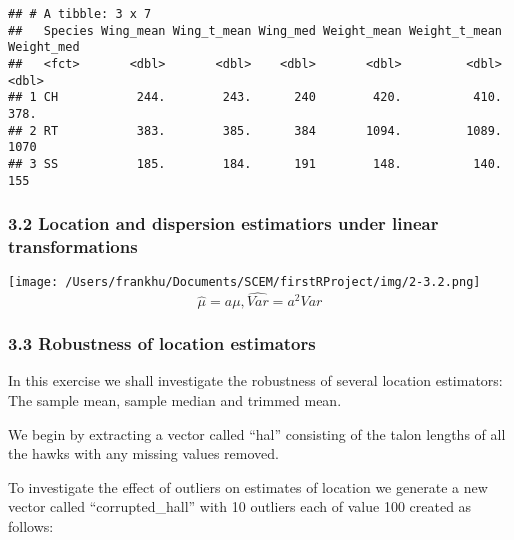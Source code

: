 \documentclass[
]{article}
\newenvironment{Shaded}{\begin{snugshade}}{\end{snugshade}}
\newcommand{\CommentTok}[1]{\textcolor[rgb]{0.56,0.35,0.01}{\textit{#1}}}
\newcommand{\FunctionTok}[1]{\textcolor[rgb]{0.00,0.00,0.00}{#1}}
\newcommand{\NormalTok}[1]{#1}
\newcommand{\OtherTok}[1]{\textcolor[rgb]{0.56,0.35,0.01}{#1}}
\newcommand{\SpecialCharTok}[1]{\textcolor[rgb]{0.00,0.00,0.00}{#1}}
\begin{document}
\begin{verbatim}
## # A tibble: 3 x 7
##   Species Wing_mean Wing_t_mean Wing_med Weight_mean Weight_t_mean Weight_med
##   <fct>       <dbl>       <dbl>    <dbl>       <dbl>         <dbl>      <dbl>
## 1 CH           244.        243.      240        420.          410.       378.
## 2 RT           383.        385.      384       1094.         1089.      1070 
## 3 SS           185.        184.      191        148.          140.       155
\end{verbatim}

\hypertarget{location-and-dispersion-estimatiors-under-linear-transformations}{%
\subsubsection{3.2 Location and dispersion estimatiors under linear
transformations}\label{location-and-dispersion-estimatiors-under-linear-transformations}}

\texttt{[image: /Users/frankhu/Documents/SCEM/firstRProject/img/2-3.2.png]}
\[\hat\mu=a\mu, \hat{Var}=a^2Var\]

\hypertarget{robustness-of-location-estimators}{%
\subsubsection{3.3 Robustness of location
estimators}\label{robustness-of-location-estimators}}

In this exercise we shall investigate the robustness of several location
estimators: The sample mean, sample median and trimmed mean.

We begin by extracting a vector called ``hal'' consisting of the talon
lengths of all the hawks with any missing values removed.

\begin{Shaded}
\end{Shaded}

To investigate the effect of outliers on estimates of location we
generate a new vector called ``corrupted\_hall'' with 10 outliers each
of value 100 created as follows:
\end{document}
